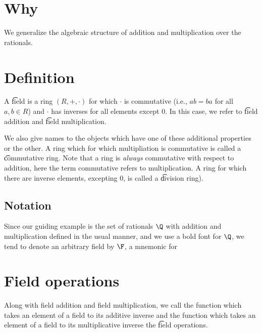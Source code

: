 

\section*{Why}

We generalize the algebraic structure of addition and multiplication over the rationals.

\section*{Definition}

A \t{field} is a ring $(R, +, \cdot  )$ for which $\cdot  $ is commutative (i.e., $ab = ba$ for all $a, b \in R$) and $\cdot  $ has inverses for all elements except $0$.
In this case, we refer to \t{field addition} and \t{field multiplication}.

We also give names to the objects which have one of these additional properties or the other.
A ring which for which multipliation is commutative is called a \t{commutative ring}.
Note that a ring is \textit{always} commutative with respect to addition, here the term commutative refers to multiplication.
A ring for which there are inverse elements, excepting 0, is called a \t{division ring}).

\subsection*{Notation}

Since our guiding example is the set of rationals $\Q  $ with addition and multiplication defined in the usual manner, and we use a bold font for $\Q  $, we tend to denote an arbitrary field by $\F  $, a mnemonic for 

\section*{Field operations}

Along with field addition and field multiplication, we call the function which takes an element of a field to its additive inverse and the function which takes an element of a field to its multiplicative inverse the \t{field operations}.
\blankpage
